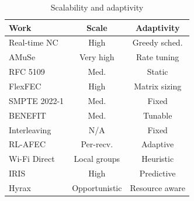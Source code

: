 \begin{table}[H]
	\centering
	\caption{Scalability and adaptivity}
	\label{tab:rw-feature-scale}
	\small
	\renewcommand{\arraystretch}{1.15}
	\setlength{\tabcolsep}{4pt}
	\begin{tabular}{|l|c|c|}
		\hline
		\textbf{Work} & \textbf{Scale} & \textbf{Adaptivity} \\
		\hline
		Real-time NC \cite{ferreira2019realtime} & High & Greedy sched. \\
		AMuSe \cite{amaldi2010amuse} & Very high & Rate tuning \\
		RFC 5109 \cite{perkins2003rfc5109} & Med. & Static \\
		FlexFEC \cite{perkins2019flexfec} & High & Matrix sizing \\
		SMPTE 2022-1 \cite{smpte2022} & Med. & Fixed \\
		BENEFIT \cite{qureshi2011benefit} & Med. & Tunable \\
		Interleaving \cite{adalier2009interleaving} & N/A & Fixed \\
		RL-AFEC \cite{chen2012018rlafec} & Per-recv. & Adaptive \\
		Wi-Fi Direct \cite{sha2016wifidirect,poderys2017overlay,androidWFD} & Local groups & Heuristic \\
		IRIS \cite{martins2018iris} & High & Predictive \\
		Hyrax \cite{inesctec_hyrax} & Opportunistic & Resource aware \\
		\hline
	\end{tabular}
\end{table}


